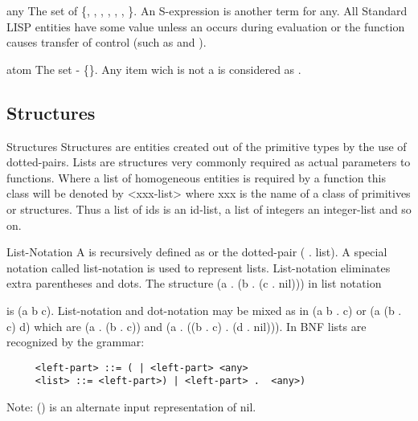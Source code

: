 \begin{Type}{any}
The set of  \{, , , 
      , ,  ,
     \}.   An  S-expression is another  term for  any.
     All  Standard LISP  entities  have some  value unless  an 
     occurs  during evaluation  or the  function causes  transfer  of
     control (such as  and ).
\end{Type}

\begin{Type}{atom}
The set  - \{\}. Any item wich is not a 
is considered as .
\end{Type}


\subsection{Structures}
\begin{Introduction}{Structures}
Structures are  entities created out  of the  primitive types by  the
use of  dotted-pairs.   Lists are  structures very commonly  required
as  actual parameters  to functions.    Where a  list of  homogeneous
entities  is  required by  a  function  this class  will  be  denoted
by <xxx-list>  where xxx  is the  name of  a class  of primitives  or
structures.  Thus a list of ids is an id-list, a list of  integers an
integer-list and so on.
\end{Introduction}

\begin{Concept}{List-Notation}
A    is  recursively  defined  as    or  the  dotted-pair
     ( . list).   A special notation called list-notation is  used
     to represent lists.  List-notation eliminates  extra parentheses
     and dots.   The structure (a .  (b .   (c .  nil))) in list  notation

     is (a b  c).  List-notation and dot-notation may be mixed as  in
     (a b .  c) or (a (b .  c) d) which are (a .  (b .   c)) and (a .
     ((b .   c) .  (d .   nil))). In BNF lists are recognized by  the
     grammar:
\begin{verbatim}
     <left-part> ::= ( | <left-part> <any>
     <list> ::= <left-part>) | <left-part> .  <any>)
\end{verbatim}
     Note:  () is an alternate input representation of nil.
\end{Concept}

